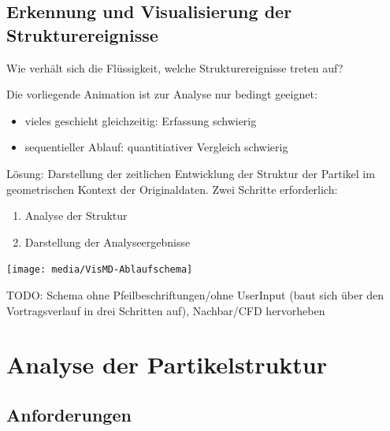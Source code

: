 \documentclass[10pt]{beamer}
\begin{document}
\subsection{Erkennung und Visualisierung der Strukturereignisse}
\begin{frame}
	Wie verhält sich die Flüssigkeit, welche Strukturereignisse treten auf?
	
	Die vorliegende Animation ist zur Analyse nur bedingt geeignet:
	\begin{itemize}
		\item vieles geschieht gleichzeitig: Erfassung schwierig
		\item sequentieller Ablauf: quantitiativer Vergleich schwierig
	\end{itemize}
	Lösung: Darstellung der zeitlichen Entwicklung der Struktur der Partikel im geometrischen Kontext der Originaldaten. Zwei Schritte erforderlich:
	\begin{enumerate}
		\item Analyse der Struktur
		\item Darstellung der Analyseergebnisse
	\end{enumerate}
	
\end{frame}


\begin{frame}
	\texttt{[image: media/VisMD-Ablaufschema]}
	
	TODO: Schema ohne Pfeilbeschriftungen/ohne UserInput (baut sich über den Vortragsverlauf in drei Schritten auf), Nachbar/CFD hervorheben

\end{frame}

\section{Analyse der Partikelstruktur}

\subsection{Anforderungen}
\end{document}
